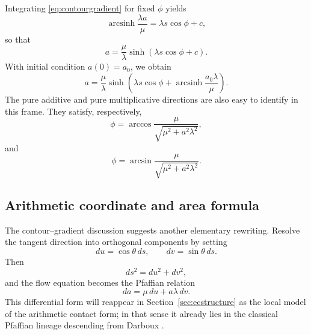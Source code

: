 Integrating \eqref{eq:contourgradient} for fixed $\phi$ yields
\begin{equation}\label{eq:rel_a_s}
    \operatorname{arcsinh}\frac{\lambda a}{\mu} = \lambda s \cos \phi + c,
\end{equation}
so that
\begin{equation}
  a = \frac{\mu}{\lambda} \sinh(\lambda s \cos \phi + c).
  \label{eq:gradevo}
\end{equation}
With initial condition $a(0)=a_0$, we obtain
\begin{equation}
    a = \frac{\mu}{\lambda} \sinh\!\left(\lambda s \cos \phi + \operatorname{arcsinh} \frac{a_0 \lambda}{\mu}\right).
    \label{eq:gradevo2}
\end{equation}
The pure additive and pure multiplicative directions are also easy to identify in this frame. They satisfy, respectively,
\begin{equation}
    \phi = \arccos \frac{\mu}{\sqrt {\mu^2 + a^2 \lambda^2}},
    \label{eq:additionalline}
\end{equation}
and
\begin{equation}
    \phi = \arcsin \frac{\mu}{\sqrt {\mu^2 + a^2 \lambda^2}}.
    \label{eq:mulitiplcativeline}
\end{equation}

\subsection{Arithmetic coordinate and area formula}\label{subsec:descartes-coordinate}

The contour--gradient discussion suggests another elementary rewriting. Resolve the tangent direction into orthogonal components by setting
\[
    du = \cos \theta\, ds,
    \qquad
    dv = \sin \theta\, ds.
\]
Then
\begin{equation}
    ds^2 = du^2 + dv^2,
\end{equation}
and the flow equation becomes the Pfaffian relation
\begin{equation}
    da = \mu \, du + a \lambda \, dv.
\end{equation}
This differential form will reappear in Section~\ref{sec:ecstructure} as the local model of the arithmetic contact form; in that sense it already lies in the classical Pfaffian lineage descending from Darboux \cite{Darboux1882Pfaff}.

